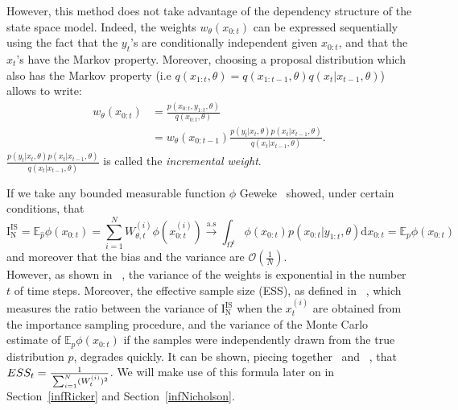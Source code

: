 \documentclass[12pt]{article}
\begin{document}
	However, this method does not take advantage of the dependency structure of the state space model. Indeed, the weights $w_\theta(x_{0:t})$ can be expressed sequentially using the fact that the $y_t$'s are conditionally independent given $x_{0:t}$, and that the $x_t$'s have the Markov property. Moreover, choosing a proposal distribution which also has the Markov property (i.e $q(x_{1:t}, \theta)=q(x_{1:t-1}, \theta)q(x_t| x_{t-1}, \theta)$) allows to write:
	\begin{align}
	w_\theta(x_{0:t}) & = \frac{p(x_{0:t},y_{1:t}, \theta)}{q(x_{0:t},\theta)} \\
	& = w_\theta(x_{0:t-1})\frac{p(y_t|x_t, \theta)p(x_t|x_{t-1}, \theta)}{q(x_t|x_{t-1}, \theta)}.
	\end{align}
	$\frac{p(y_t|x_t, \theta)p(x_t|x_{t-1}, \theta)}{q(x_t|x_{t-1}, \theta)}$ is called the \emph{incremental weight}.
	
	If we take any bounded measurable function $\phi$ Geweke~\cite{Geweke1989} showed, under certain conditions, that
	\begin{equation*}
	 \mathrm{I_N^{IS}}=\mathbb{E}_{\hat{p}}\phi(x_{0:t}) = \sum_{i=1}^{N} W_{\theta, t}^{(i)} \phi(x_{0:t}^{(i)}) \xrightarrow{\mathrm{a.s}} \int_{\Omega^t} \phi({x_{0:t}})p(x_{0:t}|y_{1:t}, \theta)\mathrm{d}x_{0:t}=\mathbb{E}_{p}\phi(x_{0:t})
	\end{equation*}
	and moreover that the bias and the variance are $\mathcal{O}(\frac{1}{N})$.\\
	
	However, as shown in ~\cite{kong1994sequential}, the variance of the weights is exponential in the number $t$ of time steps. Moreover, the effective sample size (ESS), as defined in ~\cite{liu2008monte}, which measures the ratio between the variance of $\mathrm{I_N^{IS}}$ when the $x_t^{(i)}$ are obtained from the importance sampling procedure, and the variance of the Monte Carlo estimate of $\mathbb{E}_{p}\phi(x_{0:t})$ if the samples were independently drawn from the true distribution $p$, degrades quickly.  It can be shown, piecing together~\cite[][pp.~35-36]{liu2008monte} and ~\cite[][pp.~98-100]{robert2009introducing}, that  $ESS_t = \frac{1}{\strut \sum_{i=1}^{N} (W_t^{(i)})^2}$. We will make use of this formula later on in Section~\ref{infRicker} and Section~\ref{infNicholson}.
	
\end{document}
